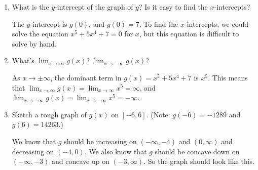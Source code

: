 \documentclass{article}
\begin{document}
\begin{enumerate}[resume]
\begin{enumerate}
\begin{solution}
    \end{solution}

  \item


    \begin{problem}[0.25in]
      What is the $y$-intercept of the graph of $g$? Is it easy to find the $x$-intercepts?
    \end{problem}

    \begin{solution}
      The $y$-intercept is $g(0)$, and $g(0)=7$. To find the $x$-intercepts, we could
      solve the equation $x^5+5x^4+7=0$ for $x$, but this equation is difficult to solve
      by hand.
    \end{solution}

  \item

    \begin{problem}
      What's $\displaystyle \lim_{x \to \infty} g(x)$? \hspace{1in} $\displaystyle \lim_{x \to -\infty} g(x)$?
    \end{problem}

    \begin{solution}
      As $x \to \pm \infty$, the dominant term in $g(x)=x^5 + 5x^4 + 7$ is $x^5$. This means
      that $\displaystyle \lim_{x\to \infty} g(x) = \lim_{x\to \infty} x^5 = \infty$, and 
      $\displaystyle \lim_{x \to -\infty} g(x) = \lim_{x \to -\infty} x^5 = -\infty$.  
    \end{solution}

  \item
    \begin{problem}[\vfill\newpage]
      Sketch a rough graph of $g(x)$ on $[-6, 6]$.  (Note: $g(-6) = -1289$
      and $g(6) = 14263$.)
    \end{problem}

    \begin{solution}
    We know that $g$ should be increasing on $(-\infty, -4)$ and $(0, \infty)$ and 
    decreasing on $(-4, 0)$. We also know that $g$ should be concave down on $(-\infty, -3)$
    and concave up on $(-3, \infty)$. So the graph should look like this.
      \begin{center}
      \end{center}
    \end{solution}


\end{enumerate}
\end{enumerate}
\end{document}
